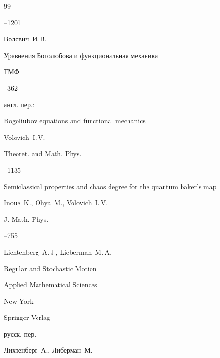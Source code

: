 \begin{thebibliography}{99}



--1201




\by Волович~И.\,В.

\paper Уравнения Боголюбова и функциональная механика 

\jour ТМФ




--362

\transl англ. пер.:~

\paper Bogoliubov equations and functional mechanics

\by Volovich~I.\,V.

\jour Theoret. and Math. Phys.




--1135




\paper  Semiclassical properties and chaos degree for the quantum baker's map

\by Inoue~K., Ohya~M., Volovich~I.\,V.

\jour J. Math. Phys.




--755






\by Lichtenberg~A.\,J., Lieberman~M.\,A. 

\book Regular and Stochastic Motion

\serial Applied Mathematical Sciences


\publaddr New York

\publ Springer-Verlag



\rtransl русск. пер.:~

\by Лихтенберг~А., Либерман~М.


\end{thebibliography}
